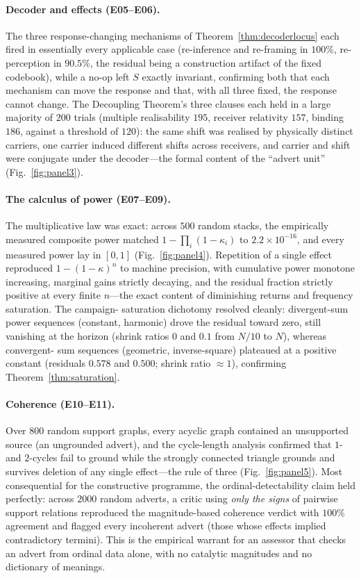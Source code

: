 \documentclass[twocolumn,11pt,a4paper]{article}
\theoremstyle{adv}
\theoremstyle{definition}
\theoremstyle{remark}
\newcommand{\Sval}{S}                  %
\newcommand{\pot}{\kappa}             %
\begin{document}
\paragraph{Decoder and effects (E05--E06).}
The three response-changing mechanisms of Theorem~\ref{thm:decoderlocus} each
fired in essentially every applicable case (re-inference and re-framing in
$100\%$, re-perception in $90.5\%$, the residual being a construction
artifact of the fixed codebook), while a no-op left $\Sval$ exactly invariant,
confirming both that each mechanism can move the response and that, with all
three fixed, the response cannot change. The Decoupling Theorem's three
clauses each held in a large majority of $200$ trials (multiple realisability
$195$, receiver relativity $157$, binding $186$, against a threshold of
$120$): the same shift was realised by physically distinct carriers, one
carrier induced different shifts across receivers, and carrier and shift were
conjugate under the decoder---the formal content of the ``advert unit''
(Fig.~\ref{fig:panel3}).

\paragraph{The calculus of power (E07--E09).}
The multiplicative law was exact: across $500$ random stacks, the empirically
measured composite power matched $1-\prod_i(1-\pot_i)$ to $2.2\times10^{-16}$,
and every measured power lay in $[0,1]$ (Fig.~\ref{fig:panel4}). Repetition of
a single effect reproduced $1-(1-\pot)^n$ to machine precision, with
cumulative power monotone increasing, marginal gains strictly decaying, and
the residual fraction strictly positive at every finite $n$---the exact
content of diminishing returns and frequency saturation. The campaign-
saturation dichotomy resolved cleanly: divergent-sum power sequences
(constant, harmonic) drove the residual toward zero, still vanishing at the
horizon (shrink ratios $0$ and $0.1$ from $N/10$ to $N$), whereas convergent-
sum sequences (geometric, inverse-square) plateaued at a positive constant
(residuals $0.578$ and $0.500$; shrink ratio $\approx1$), confirming
Theorem~\ref{thm:saturation}.

\paragraph{Coherence (E10--E11).}
Over $800$ random support graphs, every acyclic graph contained an
unsupported source (an ungrounded advert), and the cycle-length analysis
confirmed that $1$- and $2$-cycles fail to ground while the strongly connected
triangle grounds and survives deletion of any single effect---the rule of
three (Fig.~\ref{fig:panel5}). Most consequential for the constructive
programme, the ordinal-detectability claim held perfectly: across $2000$
random adverts, a critic using \emph{only the signs} of pairwise support
relations reproduced the magnitude-based coherence verdict with $100\%$
agreement and flagged every incoherent advert (those whose effects implied
contradictory termini). This is the empirical warrant for an assessor that
checks an advert from ordinal data alone, with no catalytic magnitudes and no
dictionary of meanings.
\end{document}
